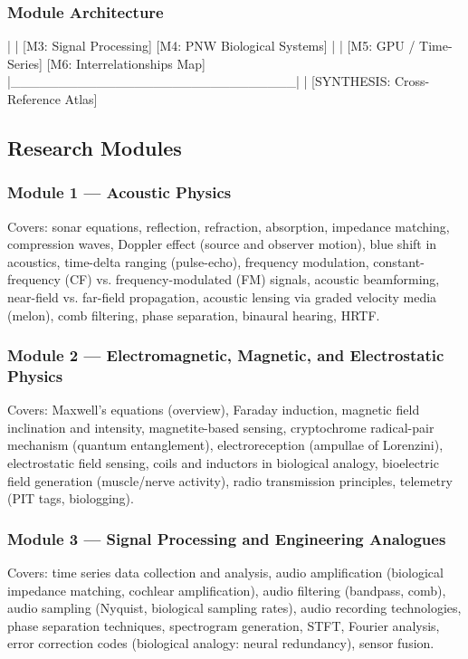 \documentclass[11pt,letterpaper]{article}
\begin{document}
\subsubsection{Module Architecture}

\begin{asciibox}
             |                              |
      [M3: Signal Processing]       [M4: PNW Biological Systems]
             |                              |
      [M5: GPU / Time-Series]       [M6: Interrelationships Map]
             |______________________________|
                          |
              [SYNTHESIS: Cross-Reference Atlas]
\end{asciibox}

\subsection{Research Modules}

\subsubsection{Module 1 --- Acoustic Physics}
Covers: sonar equations, reflection, refraction, absorption, impedance matching, compression waves, Doppler effect (source and observer motion), blue shift in acoustics, time-delta ranging (pulse-echo), frequency modulation, constant-frequency (CF) vs. frequency-modulated (FM) signals, acoustic beamforming, near-field vs. far-field propagation, acoustic lensing via graded velocity media (melon), comb filtering, phase separation, binaural hearing, HRTF.

\subsubsection{Module 2 --- Electromagnetic, Magnetic, and Electrostatic Physics}
Covers: Maxwell's equations (overview), Faraday induction, magnetic field inclination and intensity, magnetite-based sensing, cryptochrome radical-pair mechanism (quantum entanglement), electroreception (ampullae of Lorenzini), electrostatic field sensing, coils and inductors in biological analogy, bioelectric field generation (muscle/nerve activity), radio transmission principles, telemetry (PIT tags, biologging).

\subsubsection{Module 3 --- Signal Processing and Engineering Analogues}
Covers: time series data collection and analysis, audio amplification (biological impedance matching, cochlear amplification), audio filtering (bandpass, comb), audio sampling (Nyquist, biological sampling rates), audio recording technologies, phase separation techniques, spectrogram generation, STFT, Fourier analysis, error correction codes (biological analogy: neural redundancy), sensor fusion.
\end{document}
